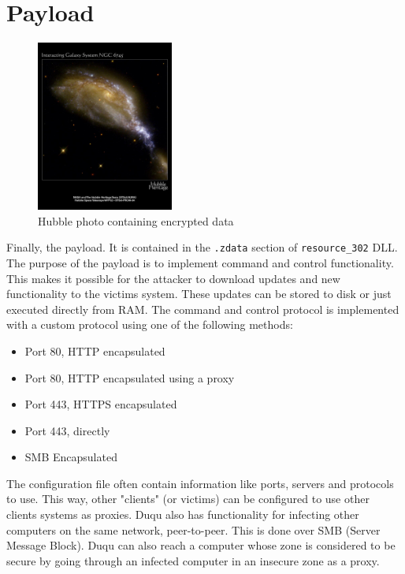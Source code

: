 \documentclass[11pt,english,a4paper]{report}
\begin{document}
\section{Payload} \label{payload}
\begin{figure} 
  \centering
  \includegraphics[width=0.40\textwidth]{hubble_duqu.jpg} 
  \caption[Hubble photo containing encrypted data]
   {Hubble photo containing encrypted data \cite{DUQU_SYMANTEC}}
   \label{hubble}
\end{figure}
Finally, the payload. It is contained in the \texttt{.zdata} section of \texttt{resource\_302} DLL. The purpose of the payload is to implement command and control functionality. This makes it possible for the attacker to download updates and new functionality to the victims system. These updates can be stored to disk or just executed directly from RAM. The command and control protocol is implemented with a custom protocol using one of the following methods:
\begin{itemize}
  \item Port 80, HTTP encapsulated
  \item Port 80, HTTP encapsulated using a proxy
  \item Port 443, HTTPS encapsulated
  \item Port 443, directly
  \item SMB Encapsulated
\end{itemize}
The configuration file often contain information like ports, servers and protocols to use. This way, other "clients" (or victims) can be configured to use other clients systems as proxies. Duqu also has functionality for infecting other computers on the same network, peer-to-peer. This is done over SMB (Server Message Block). Duqu can also reach a computer whose zone is considered to be secure by going through an infected computer in an insecure zone as a proxy. 
\end{document}
